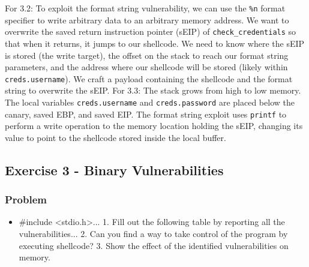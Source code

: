 \documentclass{article}
\begin{document}
For 3.2: To exploit the format string vulnerability, we can use the \texttt{\%n} format specifier to write arbitrary data to an arbitrary memory address. We want to overwrite the saved return instruction pointer (sEIP) of \texttt{check\_credentials} so that when it returns, it jumps to our shellcode. We need to know where the sEIP is stored (the write target), the offset on the stack to reach our format string parameters, and the address where our shellcode will be stored (likely within \texttt{creds.username}). We craft a payload containing the shellcode and the format string to overwrite the sEIP.
For 3.3: The stack grows from high to low memory. The local variables \texttt{creds.username} and \texttt{creds.password} are placed below the canary, saved EBP, and saved EIP. The format string exploit uses \texttt{printf} to perform a write operation to the memory location holding the sEIP, changing its value to point to the shellcode stored inside the local buffer.

\subsection{Exercise 3 - Binary Vulnerabilities}
\subsubsection*{Problem}
\begin{itemize}
    \item[\textbf{1.}] \#include <stdio.h>... 1. Fill out the following table by reporting all the vulnerabilities... 2. Can you find a way to take control of the program by executing shellcode? 3. Show the effect of the identified vulnerabilities on memory.
\end{itemize}
\end{document}
